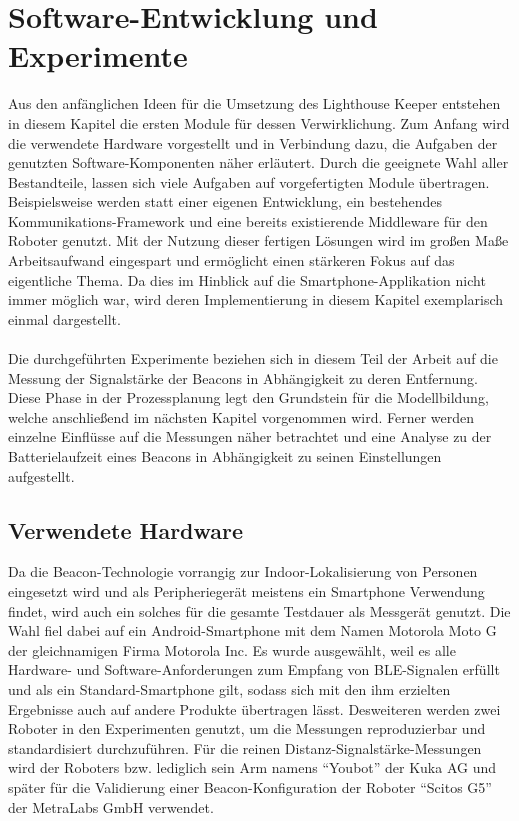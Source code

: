 \chapter{Software-Entwicklung und Experimente}
Aus den anfänglichen Ideen für die Umsetzung des Lighthouse Keeper entstehen in diesem Kapitel die ersten Module für dessen Verwirklichung. Zum Anfang wird die verwendete Hardware vorgestellt und in Verbindung dazu, die Aufgaben der genutzten Software-Komponenten näher erläutert. Durch die geeignete Wahl aller Bestandteile, lassen sich viele Aufgaben auf vorgefertigten Module übertragen. Beispielsweise werden statt einer eigenen Entwicklung, ein bestehendes Kommunikations-Framework und eine bereits existierende Middleware für den Roboter genutzt. Mit der Nutzung dieser fertigen Lösungen wird im großen Maße Arbeitsaufwand eingespart und ermöglicht einen stärkeren Fokus auf das eigentliche Thema. Da dies im Hinblick auf die Smartphone-Applikation nicht immer möglich war, wird deren Implementierung in diesem Kapitel exemplarisch einmal dargestellt. \\ \\
Die durchgeführten Experimente beziehen sich in diesem Teil der Arbeit auf die Messung der Signalstärke der Beacons in Abhängigkeit zu deren Entfernung. Diese Phase in der Prozessplanung legt den Grundstein für die Modellbildung, welche anschließend im nächsten Kapitel vorgenommen wird. Ferner werden einzelne Einflüsse auf die Messungen näher betrachtet und eine Analyse zu der Batterielaufzeit eines Beacons in Abhängigkeit zu seinen Einstellungen aufgestellt.
\section{Verwendete Hardware}
Da die Beacon-Technologie vorrangig zur Indoor-Lokalisierung von Personen eingesetzt wird und als Peripheriegerät meistens ein Smartphone Verwendung findet, wird auch ein solches für die gesamte Testdauer als Messgerät genutzt. Die Wahl fiel dabei auf ein Android-Smartphone mit dem Namen Motorola Moto G der gleichnamigen Firma Motorola Inc. Es wurde ausgewählt, weil es alle Hardware- und Software-Anforderungen zum Empfang von BLE-Signalen erfüllt und als ein Standard-Smartphone gilt, sodass sich mit den ihm erzielten Ergebnisse auch auf andere Produkte übertragen lässt. Desweiteren werden zwei Roboter in den Experimenten genutzt, um die Messungen reproduzierbar und standardisiert durchzuführen. Für die reinen Distanz-Signalstärke-Messungen wird der Roboters bzw. lediglich sein Arm namens "`Youbot"' der Kuka AG und später für die Validierung einer Beacon-Konfiguration der Roboter "`Scitos G5"' der MetraLabs GmbH verwendet. 
